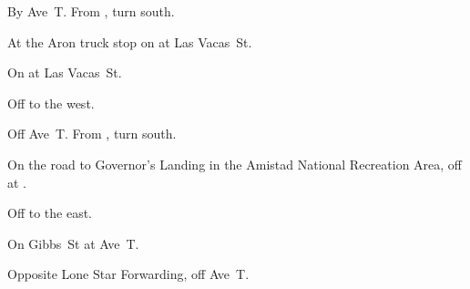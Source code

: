 
\begin{LocationList}

By Ave~T.
From , turn south.

At the Aron truck stop on  at Las Vacas~St.

\Location{\GarageHQ \Garage}
On  at Las Vacas~St.

Off   to the west.

Off Ave~T. From , turn south.

On the road to Governor's Landing
in the Amistad National Recreation Area,  %
off  at .

Off   to the east.

On  Gibbs~St at Ave~T.

\Location{\TruckService \Service}
Opposite Lone Star Forwarding, off Ave~T.

\end{LocationList}
